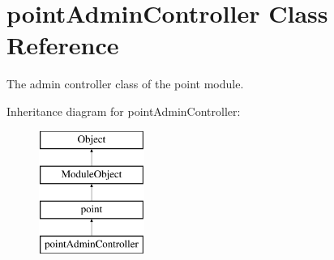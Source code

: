 \hypertarget{classpointAdminController}{\section{point\-Admin\-Controller Class Reference}
\label{classpointAdminController}
}


The admin controller class of the point module.  


Inheritance diagram for point\-Admin\-Controller\-:\begin{figure}[H]
\begin{center}
\leavevmode
\includegraphics[height=4.000000cm]{classpointAdminController}
\end{center}
\end{figure}
